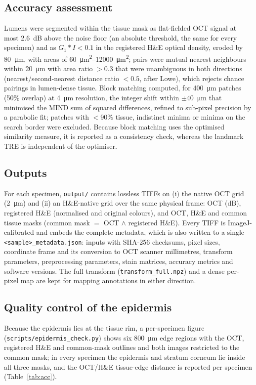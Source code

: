 \documentclass[9pt,twocolumn]{extarticle}
\begin{document}
\subsection{Accuracy assessment} Lumens were segmented within the tissue mask as flat-fielded OCT signal at most \SI{2.6}{dB} above the noise floor (an absolute threshold, the same for every specimen) and as $G_{1}\ast I<0.1$ in the registered H\&E optical density, eroded by \SI{80}{\micro\metre}, with areas of \SIrange{60}{12000}{\square\micro\metre}; pairs were mutual nearest neighbours within \SI{20}{\micro\metre} with area ratio $>0.3$ that were unambiguous in both directions (nearest/second-nearest distance ratio $<0.5$, after Lowe), which rejects chance pairings in lumen-dense tissue. Block matching computed, for \SI{400}{\micro\metre} patches (50\% overlap) at \SI{4}{\micro\metre} resolution, the integer shift within $\pm$\SI{40}{\micro\metre} that minimised the MIND sum of squared differences, refined to sub-pixel precision by a parabolic fit; patches with $<$90\% tissue, indistinct minima or minima on the search border were excluded. Because block matching uses the optimised similarity measure, it is reported as a consistency check, whereas the landmark TRE is independent of the optimiser.

\subsection{Outputs} For each specimen, \texttt{output/} contains lossless TIFFs on (i) the native OCT grid (\SI{2}{\micro\metre}) and (ii) an H\&E-native grid over the same physical frame: OCT (dB), registered H\&E (normalised and original colours), and OCT, H\&E and common tissue masks (common mask $=$ OCT $\wedge$ registered H\&E). Every TIFF is ImageJ-calibrated and embeds the complete metadata, which is also written to a single \texttt{<sample>\_metadata.json}: inputs with SHA-256 checksums, pixel sizes, coordinate frame and its conversion to OCT scanner millimetres, transform parameters, preprocessing parameters, stain matrices, accuracy metrics and software versions. The full transform (\texttt{transform\_full.npz}) and a dense per-pixel map are kept for mapping annotations in either direction.

\subsection{Quality control of the epidermis} Because the epidermis lies at the tissue rim, a per-specimen figure (\texttt{scripts/epidermis\_check.py}) shows six \SI{800}{\micro\metre} edge regions with the OCT, registered H\&E and common-mask outlines and both images restricted to the common mask; in every specimen the epidermis and stratum corneum lie inside all three masks, and the OCT/H\&E tissue-edge distance is reported per specimen (Table~\ref{tab:acc}).
\end{document}
